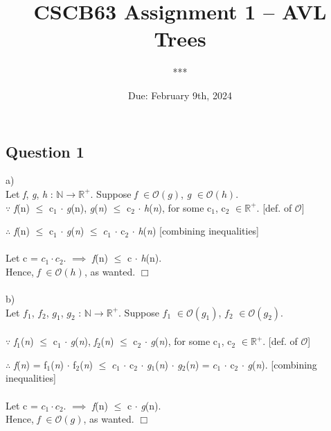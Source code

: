 \documentclass[fleqn]{article}
\title{CSCB63 Assignment 1 -- AVL Trees}
\author{***}
\date{Due: February 9th, 2024}
\newcommand{\bigo}[1]{\mathcal{O}(#1)}
\newcommand{\ital}{\itshape{}}
\begin{document}
\maketitle

\subsection*{Question 1}

a) \\ 
Let {\itshape f}, {\itshape g}, {\itshape h} : $\mathbb{N} \rightarrow \mathbb{R^+}$.
Suppose {\itshape f} $\in \bigo{g}$, {\itshape g} $\in \bigo{h}$. \\

\noindent $\because$ 
{\itshape f}(n) $\leq$ c$_{1}$ $\cdot$ {\itshape g}(n),
{\itshape g}({\itshape n}) $\leq$ c$_{2}$ $\cdot$ {\ital h}({\itshape n}), 
for some c$_{1}$, c$_{2}$ $\in \mathbb{R^{+}}$. [def. of $\mathcal{O}$]

\noindent $\therefore$
{\ital f}(n) $\leq$ c$_1$ 
$\cdot$ {\ital g}({\ital n}) $\leq$ $c_1$ $\cdot$ c$_2$ $\cdot$ {\ital h}({\ital n})
[combining inequalities] \\ \\

\noindent
Let c = $c_1 \cdot c_2$. 
$\implies$ {\ital f}(n) $\leq$ c $\cdot$ {\ital h}(n). \\
Hence, {\ital f} $\in \bigo{h}$, as wanted. $\Box$ \\ \\

\noindent
b) \\
Let {\itshape $f_1$}, {\itshape $f_2$}, {\itshape $g_1$}, {\itshape $g_2$} : 
$\mathbb{N} \rightarrow \mathbb{R^+}$.
Suppose {\itshape $f_1$} $\in \bigo{g_1}$, {\itshape $f_2$} $\in \bigo{g_2}$. \\ \\

\noindent $\because$ 
{\itshape f$_1$}({\ital n}) $\leq$ c$_{1}$ $\cdot$ {\itshape g}({\ital n}),
{\itshape f$_2$}({\ital n}) $\leq$ c$_{2}$ $\cdot$ {\itshape g}({\ital n}),
for some c$_{1}$, c$_{2}$ $\in \mathbb{R^{+}}$. [def. of $\mathcal{O}$]

\noindent $\therefore$
{\ital f}({\ital n}) = f$_{1}$({\ital n}) $\cdot$ f$_{2}$({\ital n}) $\leq$
$c_1$ $\cdot$ c$_2$ $\cdot$ {\ital g$_1$}({\ital n}) $\cdot$ {\ital g$_2$}({\ital n}) =
$c_1$ $\cdot$ c$_2$ $\cdot$ {\ital g}({\ital n}).
[combining inequalities] \\ \\

\noindent
Let c = $c_1 \cdot c_2$. 
$\implies$ {\ital f}(n) $\leq$ c $\cdot$ {\ital g}(n). \\
Hence, {\ital f} $\in \bigo{g}$, as wanted. $\Box$ \\ \\
\end{document}
